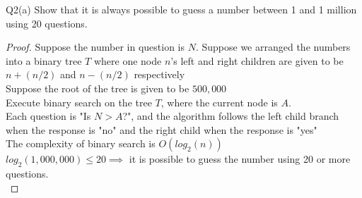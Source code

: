 \begin{problem}
  {Q2(a)}
  Show that it is always possible to guess a number between 1 and 1 million using 20 questions.
  \begin{proof}
    Suppose the number in question is $N$.
    Suppose we arranged the numbers into a binary tree $T$ where one node $n$'s left and right children are given to be $n + (n / 2)$ and $n - (n / 2)$ respectively \\
    Suppose the root of the tree is given to be $500,000$ \\
    Execute binary search on the tree $T$, where the current node is $A$. \\
    Each question is "Is $N > A$?", and the algorithm follows the left child branch when the response is "no" and the right child when the response is "yes" \\
    The complexity of binary search is $O(log_2(n))$ \\
    $log_2(1,000,000) \leq 20 \implies $ it is possible to guess the number using 20 or more questions. \\
  \end{proof}
\end{problem}
